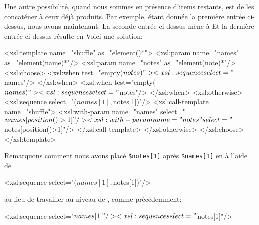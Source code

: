 Une autre possibilité, quand nous sommes en présence d'items restants,
est de les concaténer à ceux déjà produits. Par exemple, étant donnée
la première entrée ci-dessus, nous avons maintenant:
\noindent La seconde entrée ci-dessus mène à
\noindent Et la dernière entrée ci-dessus résulte en
\noindent Voici une solution:
\begin{sverb}
  <xsl:template name="shuffle" as="element()*">
    <xsl:param name="names" as="element(name)*"/>
    <xsl:param name="notes" as="element(note)*"/>
    <xsl:choose>
      <xsl:when test="empty($notes)">
        <xsl:sequence select="$names"/>
      </xsl:when>
      <xsl:when test="empty($names)">
        <xsl:sequence select="$notes"/>
      </xsl:when>
      <xsl:otherwise>
        <xsl:sequence select="($names[1],$notes[1])"/>
        <xsl:call-template name="shuffle">
          <xsl:with-param name="names"
                          select="$names[position()>1]"/>
          <xsl:with-param name="notes"
                          select="$notes[position()>1]"/>
        </xsl:call-template>
      </xsl:otherwise>
    </xsl:choose>
  </xsl:template>
\end{sverb}
Remarquons comment nous avons placé \texttt{\$notes[1]} après
\texttt{\$names[1]} en \XPath à l'aide de
\begin{sverb}
        <xsl:sequence select="($names[1],$notes[1])"/>
\end{sverb}
au lieu de travailler au niveau de \XSLT, comme précédemment:
\begin{sverb}
      <xsl:sequence select="$names[1]"/>
      <xsl:sequence select="$notes[1]"/>
\end{sverb}

